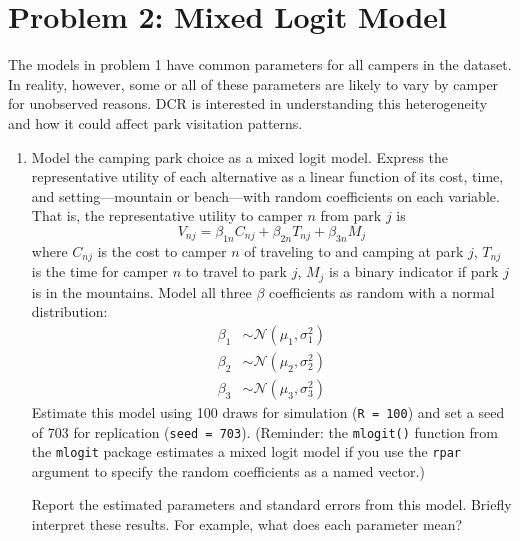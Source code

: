 \documentclass[11pt,letterpaper]{article}
\begin{document}
\section*{Problem 2: Mixed Logit Model}

The models in problem 1 have common parameters for all campers in the dataset. In reality, however, some or all of these parameters are likely to vary by camper for unobserved reasons. DCR is interested in understanding this heterogeneity and how it could affect park visitation patterns.

\begin{enumerate}[label=\alph*., leftmargin=*]

	\item Model the camping park choice as a mixed logit model. Express the representative utility of each alternative as a linear function of its cost, time, and setting---mountain or beach---with random coefficients on each variable. That is, the representative utility to camper $n$ from park $j$ is
	$$V_{nj} = \beta_{1n} C_{nj} + \beta_{2n} T_{nj} + \beta_{3n} M_j$$
	where $C_{nj}$ is the cost to camper $n$ of traveling to and camping at park $j$, $T_{nj}$ is the time for camper $n$ to travel to park $j$, $M_j$ is a binary indicator if park $j$ is in the mountains. Model all three $\beta$ coefficients as random with a normal distribution:
	\begin{align*}
		\beta_1 & \sim \mathcal{N}(\mu_1, \sigma_1^2) \\
		\beta_2 & \sim \mathcal{N}(\mu_2, \sigma_2^2) \\
		\beta_3 & \sim \mathcal{N}(\mu_3, \sigma_3^2)
	\end{align*}
	Estimate this model using 100 draws for simulation (\texttt{R = 100}) and set a seed of 703 for replication (\texttt{seed = 703}). (Reminder: the \texttt{mlogit()} function from the \texttt{mlogit} package estimates a mixed logit model if you use the \texttt{rpar} argument to specify the random coefficients as a named vector.)

	Report the estimated parameters and standard errors from this model. Briefly interpret these results. For example, what does each parameter mean?


\end{enumerate}
\end{document}
